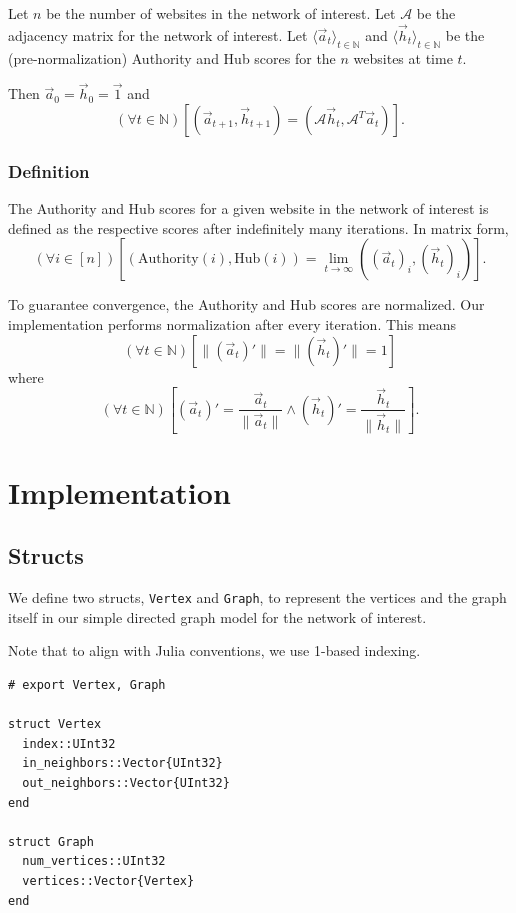 \documentclass[12pt, titlepage, twoside]{amsart}
\newcommand{\N}{\ensuremath{\mathbb N}}
\begin{document}
Let $n$ be the number of websites in the network of interest.
Let $\mathcal{A}$ be the adjacency matrix for the network of interest.
Let $\langle\vec{a}_t\rangle_{t\in\N}$ and $\langle\vec{h}_t\rangle_{t\in\N}$ be the (pre-normalization)
Authority and Hub scores for the $n$ websites at time $t$.

Then $\vec{a}_0 = \vec{h}_0 = \vec{1}$ and
\[
  (\forall t\in\N)
  \left[
    \left(\vec{a}_{t + 1}, \vec{h}_{t + 1}\right) = \left(\mathcal{A}\vec{h}_t, \mathcal{A}^T\vec{a}_t\right)
  \right].
\]

\subsubsection{Definition} The Authority and Hub scores for a given website in the network of interest is defined
as the respective scores after indefinitely many iterations.
In matrix form,
\[
  (\forall i\in[n])
  \left[
    \left(\mathrm{Authority}(i), \mathrm{Hub}(i)\right) =
    \lim_{t\to\infty}
    \left((\vec{a}_t)_i, (\vec{h}_t)_i\right)
  \right].
\]

To guarantee convergence, the Authority and Hub scores are normalized.
Our implementation performs normalization after every iteration.
This means
\[
  (\forall t\in\N)
  \left[
    \lVert(\vec{a}_t)'\rVert = \lVert(\vec{h}_t)'\rVert = 1
  \right]
\]
where
\[
  (\forall t\in\N)
  \left[
    (\vec{a}_t)' = \frac{\vec{a}_t}{\lVert\vec{a}_t\rVert}
    \wedge
    (\vec{h}_t)' = \frac{\vec{h}_t}{\lVert\vec{h}_t\rVert}
  \right].
\]

\section{Implementation}

\subsection{Structs}

We define two structs, \texttt{Vertex} and \texttt{Graph}, to represent
the vertices and the graph itself in our simple directed graph model for the network of interest.

Note that to align with Julia conventions, we use 1-based indexing.~\cite{julialang}

\begin{verbatim}
# export Vertex, Graph

struct Vertex
  index::UInt32
  in_neighbors::Vector{UInt32}
  out_neighbors::Vector{UInt32}
end

struct Graph
  num_vertices::UInt32
  vertices::Vector{Vertex}
end
\end{verbatim}
\end{document}
